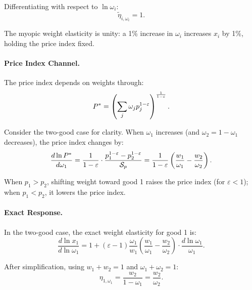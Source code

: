 Differentiating with respect to $\ln \omega_i$:
\begin{equation}
\label{eq:myopic-weight}
\tilde{\eta}_{i,\omega_i} = 1.
\end{equation}

The myopic weight elasticity is unity: a 1\% increase in $\omega_i$ increases $x_i$ by 1\%, holding the price index fixed.

\paragraph{Price Index Channel.}

The price index depends on weights through:
\begin{equation}
P^{*} = \left( \sum_j \omega_j p_j^{1-\varepsilon} \right)^{\frac{1}{1-\varepsilon}}.
\end{equation}

Consider the two-good case for clarity. When $\omega_1$ increases (and $\omega_2 = 1 - \omega_1$ decreases), the price index changes by:
\begin{equation}
\frac{d \ln P^{*}}{d \omega_1} = \frac{1}{1-\varepsilon} \cdot \frac{p_1^{1-\varepsilon} - p_2^{1-\varepsilon}}{\mathcal{S}_p} = \frac{1}{1-\varepsilon} \left( \frac{w_1}{\omega_1} - \frac{w_2}{\omega_2} \right).
\end{equation}

When $p_1 > p_2$, shifting weight toward good 1 raises the price index (for $\varepsilon < 1$); when $p_1 < p_2$, it lowers the price index.

\paragraph{Exact Response.}

In the two-good case, the exact weight elasticity for good 1 is:
\begin{equation}
\frac{d \ln x_1}{d \ln \omega_1} = 1 + (\varepsilon - 1) \frac{\omega_1}{w_1} \left( \frac{w_1}{\omega_1} - \frac{w_2}{\omega_2} \right) \cdot \frac{d \ln \omega_1}{\omega_1}.
\end{equation}

After simplification, using $w_1 + w_2 = 1$ and $\omega_1 + \omega_2 = 1$:
\begin{equation}
\label{eq:exact-weight}
\eta_{1,\omega_1} = \frac{w_2}{1 - \omega_1} = \frac{w_2}{\omega_2}.
\end{equation}


